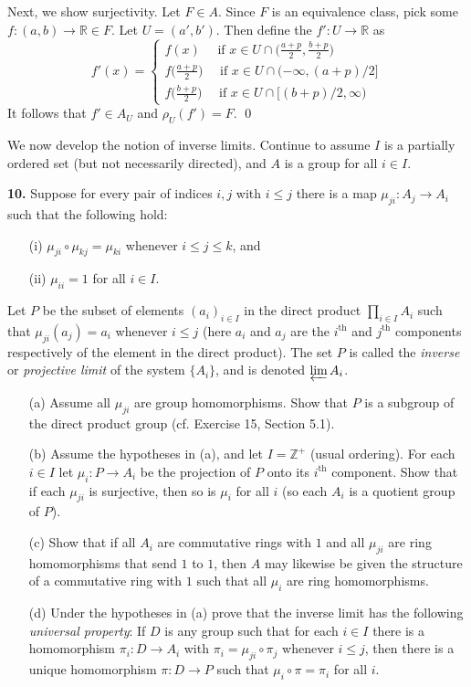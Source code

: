 \documentclass{article}
\theoremstyle{definition}
\theoremstyle{remark}
\begin{document}
Next, we show surjectivity. Let $F \in A$. Since $F$ is an equivalence class, pick some $f: (a, b) \to \mathbb R \in F$. Let $U = (a', b')$. Then define the $f': U \to  \mathbb{R}$ as 
$$
f'(x) = \begin{cases}
    f(x) \quad \text{ if } x \in U \cap \big(\frac{a+p}{2}, \frac{b+p}{2}\big) \\
    f\big(\frac{a + p}{2}\big) \quad \text{ if } x \in U \cap (-\infty, (a + p)/2] \\
    f\big(\frac{b + p}2\big) \quad \text{ if } x \in U \cap [(b+p)/2, \infty) 
\end{cases}$$
It follows that $f'\in A_U$ and $\rho_U(f') = F.$  \qed

We now develop the notion of inverse limits. Continue to assume $I$ is a partially ordered set (but not necessarily directed), and $A$ is a group for all $i \in I$.

\noindent
\textbf{10.} Suppose for every pair of indices $i, j$ with $i \leq j$ there is a map $\mu_{ji} : A_j \to A_i$ such that the following hold:
\begin{enumerate}
    \item[(i)] $\mu_{ji} \circ \mu_{kj} = \mu_{ki}$ whenever $i \leq j \leq k$, and
    \item[(ii)] $\mu_{ii} = 1$ for all $i \in I$.
\end{enumerate}
Let $P$ be the subset of elements $(a_i)_{i \in I}$ in the direct product $\prod_{i \in I} A_i$ such that $\mu_{ji}(a_j) = a_i$ whenever $i \leq j$ (here $a_i$ and $a_j$ are the $i^{\text{th}}$ and $j^{\text{th}}$ components respectively of the element in the direct product). The set $P$ is called the \textit{inverse} or \textit{projective limit} of the system $\{A_i\}$, and is denoted $\varprojlim A_i$.

\begin{enumerate}
    \item[(a)] Assume all $\mu_{ji}$ are group homomorphisms. Show that $P$ is a subgroup of the direct product group (cf. Exercise 15, Section 5.1).
    
    \item[(b)] Assume the hypotheses in (a), and let $I = \mathbb{Z}^+$ (usual ordering). For each $i \in I$ let $\mu_i : P \to A_i$ be the projection of $P$ onto its $i^{\text{th}}$ component. Show that if each $\mu_{ji}$ is surjective, then so is $\mu_i$ for all $i$ (so each $A_i$ is a quotient group of $P$).
    
    \item[(c)] Show that if all $A_i$ are commutative rings with $1$ and all $\mu_{ji}$ are ring homomorphisms that send $1$ to $1$, then $A$ may likewise be given the structure of a commutative ring with $1$ such that all $\mu_i$ are ring homomorphisms.
    
    \item[(d)] Under the hypotheses in (a) prove that the inverse limit has the following \textit{universal property}: If $D$ is any group such that for each $i \in I$ there is a homomorphism $\pi_i : D \to A_i$ with $\pi_i = \mu_{ji} \circ \pi_j$ whenever $i \leq j$, then there is a unique homomorphism $\pi : D \to P$ such that $\mu_i \circ \pi = \pi_i$ for all $i$.
\end{enumerate}
\end{document}
